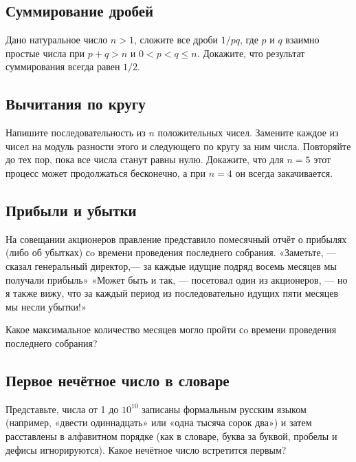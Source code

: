 \subsection*{Суммирование дробей}%

Дано натуральное число $n>1$, 
сложите все дроби $1/pq$, где $p$ и $q$ взаимно простые числа при $p+q>n$ и $0<p<q\le n$. 
Докажите, что результат суммирования всегда равен $1/2$.

\subsection*{Вычитания по кругу}

Напишите последовательность из $n$ положительных чисел. 
Замените каждое из чисел на модуль разности %
этого и следующего по кругу за ним числа. 
Повторяйте до тех пор, пока все числа станут равны нулю. 
Докажите, что для $n=5$ этот процесс может продолжаться бесконечно, 
а при $n=4$ он всегда закачивается.

\subsection*{Прибыли и убытки}%

На совещании акционеров правление представило помесячный отчёт о прибылях (либо об убытках) сo времени проведения последнего собрания. «Заметьте, --- сказал генеральный директор,--- за каждые идущие подряд восемь месяцев мы получали прибыль»
«Может быть и так, --- посетовал один из акционеров, --- но я также вижу, что за каждый период из последовательно идущих пяти месяцев мы несли убытки!»

Какое максимальное количество месяцев могло пройти сo времени проведения последнего собрания?

\subsection*{Первое нечётное число в словаре}%

Представьте, числа от 1 до $10^{10}$ записаны формальным русским языком (например, «двести одиннадцать» или «одна тысяча сорок два») и затем расставлены в алфавитном порядке (как в словаре, буква за буквой, пробелы и дефисы игнорируются). 
Какое нечётное число встретится первым?
